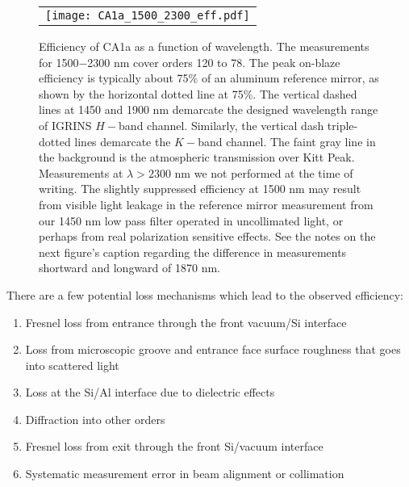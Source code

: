 \documentclass[]{spie}
\begin{document}
\begin{figure}
\begin{center}
 \begin{tabular}{c}
    \texttt{[image: CA1a\_1500\_2300\_eff.pdf]}
   \end{tabular}
  \end{center}
  \caption[CA1a Efficiency]{\label{fig:CA1a-efficiency} Efficiency of CA1a as a function of wavelength.  The measurements for 1500$-$2300 nm cover orders 120 to 78.  The peak on-blaze efficiency is typically about 75\% of an aluminum reference mirror, as shown by the horizontal dotted line at 75\%.  The vertical dashed lines at 1450 and 1900 nm demarcate the designed wavelength range of IGRINS $H-$band channel.  Similarly, the vertical dash triple-dotted lines demarcate the $K-$band channel.  The faint gray line in the background is the atmospheric transmission over Kitt Peak\cite{hinkle1995}.  Measurements at $\lambda > 2300 $ nm we not performed at the time of writing.  The slightly suppressed efficiency at 1500 nm may result from visible light leakage in the reference mirror measurement from our 1450 nm low pass filter operated in uncollimated light, or perhaps from real polarization sensitive effects.  See the notes on the next figure's caption regarding the difference in measurements shortward and longward of 1870 nm.}
\end{figure}

 There are a few potential loss mechanisms which lead to the observed efficiency:
\begin{enumerate}
\item Fresnel loss from entrance through the front vacuum/Si interface
\item Loss from microscopic groove and entrance face surface roughness that goes into scattered light
\item Loss at the Si/Al interface due to dielectric effects
\item Diffraction into other orders
\item Fresnel loss from exit through the front Si/vacuum interface
\item Systematic measurement error in beam alignment or collimation
\end{enumerate}
\end{document}
